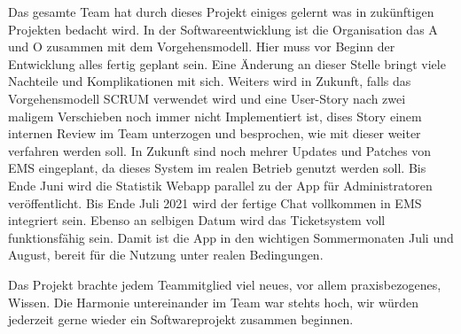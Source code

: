 Das gesamte Team hat durch dieses Projekt einiges gelernt was in zukünftigen Projekten bedacht wird.
In der Softwareentwicklung ist die Organisation das A und O zusammen mit dem Vorgehensmodell. Hier muss vor Beginn der Entwicklung alles fertig geplant sein.
Eine Änderung an dieser Stelle bringt viele Nachteile und Komplikationen mit sich.
Weiters wird in Zukunft, falls das Vorgehensmodell SCRUM verwendet wird und eine User-Story nach zwei maligem Verschieben noch immer nicht Implementiert ist,
dises Story einem internen Review im Team unterzogen und besprochen, wie mit dieser weiter verfahren werden soll.
\newpage
In Zukunft sind noch mehrer Updates und Patches von EMS eingeplant, da dieses System im realen Betrieb genutzt werden soll. Bis Ende Juni wird die Statistik Webapp parallel zu der App für
Administratoren veröffentlicht. Bis Ende Juli 2021 wird der fertige Chat vollkommen in EMS integriert sein.
Ebenso an selbigen Datum wird das Ticketsystem voll funktionsfähig sein. Damit ist die App in den wichtigen Sommermonaten Juli und August, bereit für
die Nutzung unter realen Bedingungen.

Das Projekt brachte jedem Teammitglied viel neues, vor allem praxisbezogenes, Wissen. Die Harmonie untereinander im Team war stehts hoch, wir würden jederzeit gerne wieder ein
Softwareprojekt zusammen beginnen.